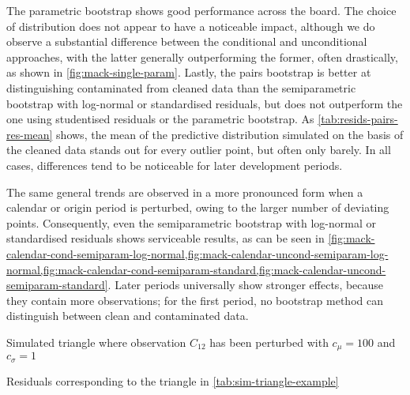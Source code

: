 \documentclass[a4paper]{book}
\begin{document}
The parametric bootstrap shows good performance across the board. The choice of distribution does not appear to have a noticeable impact, although we do observe a substantial difference between the conditional and unconditional approaches, with the latter generally outperforming the former, often drastically, as shown in \cref{fig:mack-single-param}. Lastly, the pairs bootstrap is better at distinguishing contaminated from cleaned data than the semiparametric bootstrap with log-normal or standardised residuals, but does not outperform the one using studentised residuals or the parametric bootstrap. As \cref{tab:resids-pairs-res-mean} shows, the mean of the predictive distribution simulated on the basis of the cleaned data stands out for every outlier point, but often only barely. In all cases, differences tend to be noticeable for later development periods.

The same general trends are observed in a more pronounced form when a calendar or origin period is perturbed, owing to the larger number of deviating points. Consequently, even the semiparametric bootstrap with log-normal or standardised residuals shows serviceable results, as can be seen in \cref{fig:mack-calendar-cond-semiparam-log-normal,fig:mack-calendar-uncond-semiparam-log-normal,fig:mack-calendar-cond-semiparam-standard,fig:mack-calendar-uncond-semiparam-standard}. Later periods universally show stronger effects, because they contain more observations; for the first period, no bootstrap method can distinguish between clean and contaminated data.

\enlargethispage{10\baselineskip}

\begin{table}[!htb]
  
  \caption{Simulated triangle where observation $C_{12}$ has been perturbed with $c_\mu = 100$ and $c_\sigma = 1$}
  \label{tab:sim-triangle-example}
\end{table}

\begin{table}[!htb]
  \setlength\tabcolsep{3pt}
  \begin{subtable}{0.45\linewidth}
    \centering
    
    \label{tab:resids-standard-example}
  \end{subtable}
  \hfill
  \begin{subtable}{0.45\linewidth}
    \centering
    
    \label{tab:resids-log-normal-example}
  \end{subtable}
  \caption{Residuals corresponding to the triangle in \cref{tab:sim-triangle-example}}
\end{table}
\end{document}
